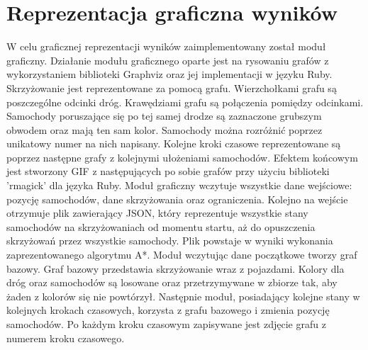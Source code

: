 \section{Reprezentacja graficzna wyników}

W celu graficznej reprezentacji wyników zaimplementowany został moduł graficzny.
\newline
\newline
Działanie modułu graficznego oparte jest na rysowaniu grafów z wykorzystaniem biblioteki Graphviz oraz jej implementacji w języku Ruby.
\newline
\newline
Skrzyżowanie jest reprezentowane za pomocą grafu. Wierzchołkami grafu są poszczególne odcinki dróg. Krawędziami grafu są połączenia pomiędzy odcinkami.
\newline
\newline
Samochody poruszające się po tej samej drodze są zaznaczone grubszym obwodem oraz mają ten sam kolor. Samochody można rozróżnić poprzez unikatowy numer na nich napisany.
\newline
\newline
Kolejne kroki czasowe reprezentowane są poprzez następne grafy z kolejnymi ułożeniami samochodów.
\newline
\newline
Efektem końcowym jest stworzony GIF z następujących po sobie grafów przy użyciu biblioteki 'rmagick' dla języka Ruby.
\newline
\newline
Moduł graficzny wczytuje wszystkie dane wejściowe: pozycję samochodów, dane skrzyżowania oraz ograniczenia. Kolejno na wejście otrzymuje plik zawierający JSON, który reprezentuje wszystkie stany samochodów na skrzyżowaniach od momentu startu, aż do opuszczenia skrzyżowań przez wszystkie samochody. Plik powstaje w wyniki wykonania zaprezentowanego algorytmu A*.
\newline
\newline
Moduł wczytując dane początkowe tworzy graf bazowy. Graf bazowy przedstawia skrzyżowanie wraz z pojazdami. Kolory dla dróg oraz samochodów są losowane oraz przetrzymywane w zbiorze tak, aby żaden z kolorów się nie powtórzył.
\newline
\newline
Następnie moduł, posiadający kolejne stany w kolejnych krokach czasowych, korzysta z grafu bazowego i zmienia pozycję samochodów. Po każdym kroku czasowym zapisywane jest zdjęcie grafu z numerem kroku czasowego.
\newline
